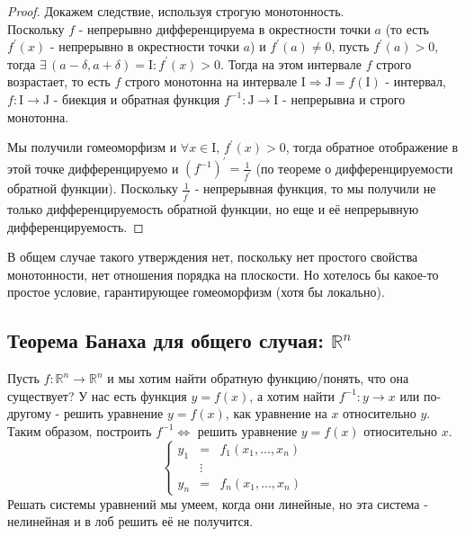 \documentclass[12pt]{article}
\newcommand{\MR}{\mathbb{R}}
\newcommand{\MI}{\mathrm{I}}
\newcommand{\MJ}{\mathrm{J}}
\theoremstyle{definition}
\begin{document}
\begin{proof}
	Докажем следствие, используя строгую монотонность. \hfill\\
	Поскольку $f$ - непрерывно дифференцируема в окрестности точки $a$ (то есть $f^\prime(x)$ - непрерывно в окрестности точки $a$) и $f^\prime(a) \neq 0$, пусть $f^\prime(a) > 0$, тогда $\exists \, (a-\delta, a + \delta) = \MI \colon f^\prime(x) > 0$. Тогда на этом интервале $f$ строго возрастает, то есть $f$ строго монотонна на интервале $\MI \Rightarrow \MJ = f(\MI)$ - интервал, $f\colon \MI \to \MJ$ - биекция и обратная функция $f^{-1} \colon \MJ \to \MI$ - непрерывна и строго монотонна. 
	
	Мы получили гомеоморфизм и $\forall x \in \MI, \, f^\prime(x) > 0$, тогда обратное отображение в этой точке дифференцируемо и 
	$(f^{-1})^\prime = \tfrac{1}{f^\prime}$ (по теореме о дифференцируемости обратной функции). Поскольку $\tfrac{1}{f^\prime}$ - непрерывная функция, то мы получили не только дифференцируемость обратной функции, но еще и её непрерывную дифференцируемость.
\end{proof}

В общем случае такого утверждения нет, поскольку нет простого свойства монотонности, нет отношения порядка на плоскости. Но хотелось бы какое-то простое условие, гарантирующее гомеоморфизм (хотя бы локально). 

\subsection*{Теорема Банаха для общего случая: $\MR^n$}
Пусть $f\colon \MR^n \to \MR^n$ и мы хотим найти обратную функцию/понять, что она существует? У нас есть функция $y = f(x)$, а хотим найти $f^{-1} \colon y \to x$ или по-другому - решить уравнение $y = f(x)$, как уравнение на $x$ относительно $y$. Таким образом, построить $f^{-1} \Leftrightarrow$ решить уравнение $y = f(x)$ относительно $x$.
$$
	\left\{\begin{array}{lcl}
		y_1  &=& f_1(x_1,\dotsc, x_n)\\
		   &\vdots& \\
		y_n  &=& f_n(x_1,\dotsc, x_n)
	\end{array}\right.
$$
Решать системы уравнений мы умеем, когда они линейные, но эта система - нелинейная и в лоб решить её не получится.
\end{document}
